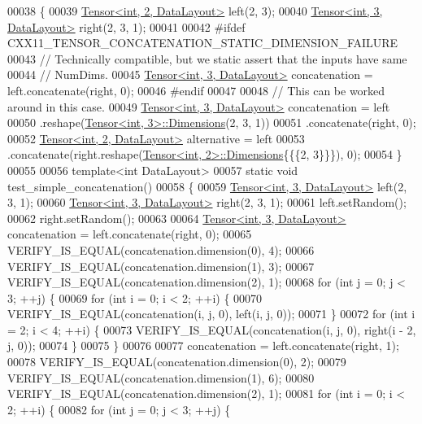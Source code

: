 \begin{DoxyCode}
00038 \{
00039   \hyperlink{class_eigen_1_1_tensor}{Tensor<int, 2, DataLayout>} left(2, 3);
00040   \hyperlink{class_eigen_1_1_tensor}{Tensor<int, 3, DataLayout>} right(2, 3, 1);
00041 
00042 \textcolor{preprocessor}{#ifdef CXX11\_TENSOR\_CONCATENATION\_STATIC\_DIMENSION\_FAILURE}
00043   \textcolor{comment}{// Technically compatible, but we static assert that the inputs have same}
00044   \textcolor{comment}{// NumDims.}
00045   \hyperlink{class_eigen_1_1_tensor}{Tensor<int, 3, DataLayout>} concatenation = left.concatenate(right, 0);
00046 \textcolor{preprocessor}{#endif}
00047 
00048   \textcolor{comment}{// This can be worked around in this case.}
00049   \hyperlink{class_eigen_1_1_tensor}{Tensor<int, 3, DataLayout>} concatenation = left
00050       .reshape(\hyperlink{class_eigen_1_1_tensor}{Tensor<int, 3>::Dimensions}(2, 3, 1))
00051       .concatenate(right, 0);
00052   \hyperlink{class_eigen_1_1_tensor}{Tensor<int, 2, DataLayout>} alternative = left
00053       .concatenate(right.reshape(\hyperlink{class_eigen_1_1_tensor}{Tensor<int, 2>::Dimensions}\{\{\{2, 3\}\}\}), 0);
00054 \}
00055 
00056 \textcolor{keyword}{template}<\textcolor{keywordtype}{int} DataLayout>
00057 \textcolor{keyword}{static} \textcolor{keywordtype}{void} test\_simple\_concatenation()
00058 \{
00059   \hyperlink{class_eigen_1_1_tensor}{Tensor<int, 3, DataLayout>} left(2, 3, 1);
00060   \hyperlink{class_eigen_1_1_tensor}{Tensor<int, 3, DataLayout>} right(2, 3, 1);
00061   left.setRandom();
00062   right.setRandom();
00063 
00064   \hyperlink{class_eigen_1_1_tensor}{Tensor<int, 3, DataLayout>} concatenation = left.concatenate(right, 0);
00065   VERIFY\_IS\_EQUAL(concatenation.dimension(0), 4);
00066   VERIFY\_IS\_EQUAL(concatenation.dimension(1), 3);
00067   VERIFY\_IS\_EQUAL(concatenation.dimension(2), 1);
00068   \textcolor{keywordflow}{for} (\textcolor{keywordtype}{int} j = 0; j < 3; ++j) \{
00069     \textcolor{keywordflow}{for} (\textcolor{keywordtype}{int} i = 0; i < 2; ++i) \{
00070       VERIFY\_IS\_EQUAL(concatenation(i, j, 0), left(i, j, 0));
00071     \}
00072     \textcolor{keywordflow}{for} (\textcolor{keywordtype}{int} i = 2; i < 4; ++i) \{
00073       VERIFY\_IS\_EQUAL(concatenation(i, j, 0), right(i - 2, j, 0));
00074     \}
00075   \}
00076 
00077   concatenation = left.concatenate(right, 1);
00078   VERIFY\_IS\_EQUAL(concatenation.dimension(0), 2);
00079   VERIFY\_IS\_EQUAL(concatenation.dimension(1), 6);
00080   VERIFY\_IS\_EQUAL(concatenation.dimension(2), 1);
00081   \textcolor{keywordflow}{for} (\textcolor{keywordtype}{int} i = 0; i < 2; ++i) \{
00082     \textcolor{keywordflow}{for} (\textcolor{keywordtype}{int} j = 0; j < 3; ++j) \{

\end{DoxyCode}

